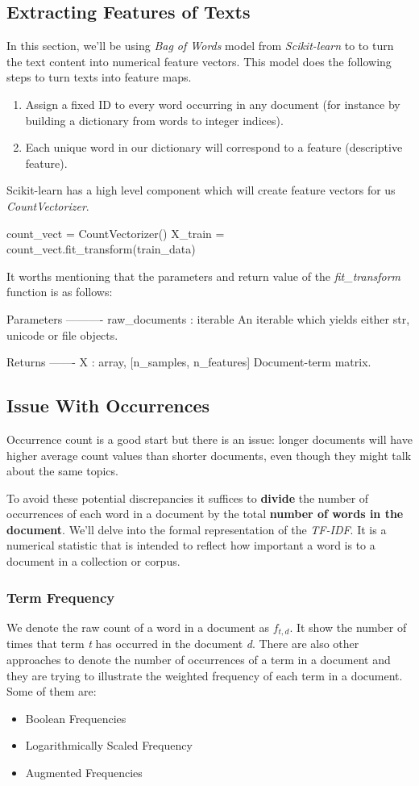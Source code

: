 \documentclass[12pt]{article}
\numberwithin{equation}{section}
\numberwithin{table}{section}
\numberwithin{figure}{section}
\begin{document}
\subsection{Extracting Features of Texts}
In this section, we'll be using \textit{Bag of Words} model from \textit{Scikit-learn} to to turn the text content into numerical feature vectors. This model does the following steps to turn texts into feature maps.
\begin{enumerate}
	\item Assign a fixed ID to every word occurring in any document (for instance by building a dictionary from words to integer indices).
	
	\item Each unique word in our dictionary will correspond to a feature (descriptive feature).
\end{enumerate}
Scikit-learn has a high level component which will create feature vectors for us \textit{CountVectorizer}.
\begin{python}
	count_vect = CountVectorizer()
	X_train = count_vect.fit_transform(train_data)
\end{python}
It worths mentioning that the parameters and return value of the \textit{fit\_transform} function is as follows:
\begin{python}
	Parameters
	----------
	raw_documents : iterable
	An iterable which yields either str, unicode or file objects.
	
	Returns
	-------
	X : array, [n_samples, n_features]
	Document-term matrix.
\end{python}

\subsection{Issue With Occurrences}
Occurrence count is a good start but there is an issue: longer documents will have higher average count values than shorter documents, even though they might talk about the same topics.

To avoid these potential discrepancies it suffices to \textbf{divide} the number of occurrences of each word in a document by the total \textbf{number of words in the document}. We'll delve into the formal representation of the \textit{TF-IDF}. It is a numerical statistic that is intended to reflect how important a word is to a document in a collection or corpus.
\subsubsection{Term Frequency}
We denote the raw count of a word in a document as $f_{t, d}$. It show the number of times that term \textit{t} has occurred in the document \textit{d}. There are also other approaches to denote the number of occurrences of a term in a document and they are trying to illustrate the weighted frequency of each term in a document. Some of them are:
\begin{itemize}
	\item Boolean Frequencies
	\item Logarithmically Scaled Frequency
	\item Augmented Frequencies
\end{itemize}
\end{document}
